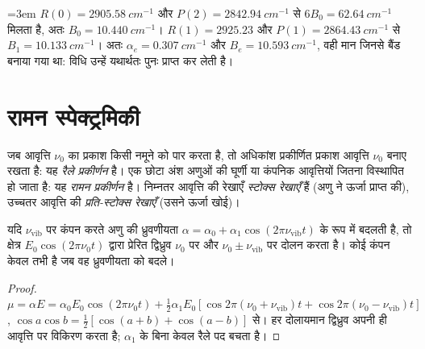 \begin{example}[बैंड से \ce{HCl} के स्थिरांक]\label{ex:b3:rovibrational-spectroscopy:analysis}\emergencystretch=3em
$R(0) = \qty{2905.58}{cm^{-1}}$ और $P(2) = \qty{2842.94}{cm^{-1}}$ से
$6B_0 = \qty{62.64}{cm^{-1}}$ मिलता है, अतः $B_0 = \qty{10.440}{cm^{-1}}$। $R(1) = 2925.23$ और $P(1) =
\qty{2864.43}{cm^{-1}}$ से $B_1 = \qty{10.133}{cm^{-1}}$। अतः $\alpha_e = \qty{0.307}{cm^{-1}}$
और $B_e = \qty{10.593}{cm^{-1}}$, वही मान जिनसे बैंड बनाया गया था:
विधि उन्हें यथार्थतः पुनः प्राप्त कर लेती है।
\end{example}

\section{रामन स्पेक्ट्रमिकी}

\begin{definition}[रामन और रैले प्रकीर्णन]\label{def:b3:rovibrational-spectroscopy:raman}
जब आवृत्ति $\nu_0$ का प्रकाश किसी नमूने को पार करता है, तो अधिकांश प्रकीर्णित प्रकाश
आवृत्ति $\nu_0$ बनाए रखता है: यह \emph{रैले प्रकीर्णन} है।
एक छोटा अंश अणुओं की घूर्णी या कंपनिक आवृत्तियों जितना
विस्थापित हो जाता है: यह \emph{रामन प्रकीर्णन} है।
निम्नतर आवृत्ति की रेखाएँ \emph{स्टोक्स रेखाएँ} हैं (अणु ने
ऊर्जा प्राप्त की), उच्चतर आवृत्ति की \emph{प्रति-स्टोक्स
रेखाएँ} (उसने ऊर्जा खोई)।
\end{definition}

\begin{proposition}[रामन प्रभाव का चिरसम्मत मूल]\label{prop:b3:rovibrational-spectroscopy:raman-classical}
यदि $\nu_{\mathrm{vib}}$ पर कंपन करते अणु की ध्रुवणीयता
$\alpha = \alpha_0 + \alpha_1\cos(2\pi\nu_{\mathrm{vib}}t)$ के रूप में बदलती है, तो
क्षेत्र $E_0\cos(2\pi\nu_0t)$ द्वारा प्रेरित द्विध्रुव $\nu_0$ पर और $\nu_0 \pm \nu_{\mathrm{vib}}$ पर दोलन करता है।
कोई कंपन केवल तभी  है जब वह ध्रुवणीयता को बदले।
\end{proposition}

\begin{proof}
$\mu = \alpha E = \alpha_0E_0\cos(2\pi\nu_0t) + \frac12\alpha_1E_0[\cos2\pi(\nu_0 +
\nu_{\mathrm{vib}})t + \cos2\pi(\nu_0 - \nu_{\mathrm{vib}})t]$, $\cos a\cos b =
\frac12[\cos(a+b) + \cos(a-b)]$ से। हर दोलायमान द्विध्रुव अपनी ही
आवृत्ति पर विकिरण करता है; $\alpha_1$ के बिना केवल रैले पद बचता है।
\end{proof}

